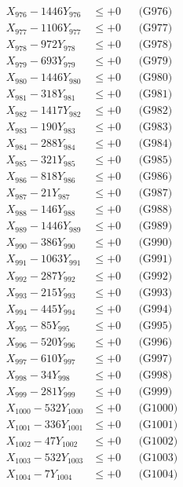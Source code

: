 \documentclass[a4paper,10pt]{article}
\begin{document}
{\begin{align}
X_{976} - 1446Y_{976} &\leq +0 && \text{(G976)} \\
X_{977} - 1106Y_{977} &\leq +0 && \text{(G977)} \\
X_{978} - 972Y_{978} &\leq +0 && \text{(G978)} \\
X_{979} - 693Y_{979} &\leq +0 && \text{(G979)} \\
X_{980} - 1446Y_{980} &\leq +0 && \text{(G980)} \\
\allowbreak
X_{981} - 318Y_{981} &\leq +0 && \text{(G981)} \\
X_{982} - 1417Y_{982} &\leq +0 && \text{(G982)} \\
X_{983} - 190Y_{983} &\leq +0 && \text{(G983)} \\
X_{984} - 288Y_{984} &\leq +0 && \text{(G984)} \\
X_{985} - 321Y_{985} &\leq +0 && \text{(G985)} \\
X_{986} - 818Y_{986} &\leq +0 && \text{(G986)} \\
X_{987} - 21Y_{987} &\leq +0 && \text{(G987)} \\
X_{988} - 146Y_{988} &\leq +0 && \text{(G988)} \\
X_{989} - 1446Y_{989} &\leq +0 && \text{(G989)} \\
X_{990} - 386Y_{990} &\leq +0 && \text{(G990)} \\
\allowbreak
X_{991} - 1063Y_{991} &\leq +0 && \text{(G991)} \\
X_{992} - 287Y_{992} &\leq +0 && \text{(G992)} \\
X_{993} - 215Y_{993} &\leq +0 && \text{(G993)} \\
X_{994} - 445Y_{994} &\leq +0 && \text{(G994)} \\
X_{995} - 85Y_{995} &\leq +0 && \text{(G995)} \\
X_{996} - 520Y_{996} &\leq +0 && \text{(G996)} \\
X_{997} - 610Y_{997} &\leq +0 && \text{(G997)} \\
X_{998} - 34Y_{998} &\leq +0 && \text{(G998)} \\
X_{999} - 281Y_{999} &\leq +0 && \text{(G999)} \\
X_{1000} - 532Y_{1000} &\leq +0 && \text{(G1000)} \\
\allowbreak
X_{1001} - 336Y_{1001} &\leq +0 && \text{(G1001)} \\
X_{1002} - 47Y_{1002} &\leq +0 && \text{(G1002)} \\
X_{1003} - 532Y_{1003} &\leq +0 && \text{(G1003)} \\
X_{1004} - 7Y_{1004} &\leq +0 && \text{(G1004)} \\

\end{align}}
\end{document}
